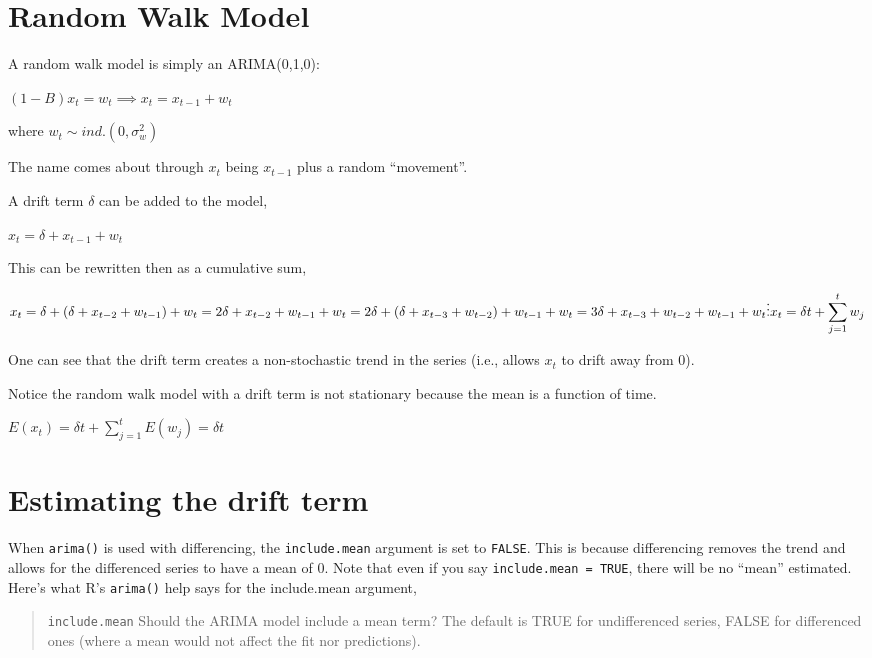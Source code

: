 \documentclass[
]{book}
\theoremstyle{definition}
\theoremstyle{definition}
\theoremstyle{definition}
\theoremstyle{definition}
\theoremstyle{remark}
\begin{document}
\hypertarget{random-walk-model}{%
\section{Random Walk Model}\label{random-walk-model}}

A random walk model is simply an ARIMA(0,1,0):

\((1-B)x_t=w_t\implies x_t=x_{t-1}+w_t\)

where \(w_t \sim ind.(0, \sigma_w^2)\)

The name comes about through \(x_t\) being \(x_{t-1}\) plus a random ``movement''.

A drift term \(\delta\) can be added to the model,

\(x_t=\delta+x_{t-1}+w_t\)

This can be rewritten then as a cumulative sum,

\[x_t=\delta+(\delta+x_{t-2}+w_{t-1})+w_t\\
=2\delta+x_{t-2}+w_{t-1}+w_t\\
=2\delta+(\delta+x_{t-3}+w_{t-2})+w_{t-1}+w_t\\
=3\delta+x_{t-3}+w_{t-2}+w_{t-1}+w_t\\
\vdots\\
x_t=\delta t+\sum_{j=1}^{t}w_j\]

One can see that the drift term creates a non-stochastic trend in the series (i.e., allows \(x_t\) to drift away from 0).

Notice the random walk model with a drift term is not stationary because the mean is a function of time.

\(E(x_t)=\delta t +\sum_{j=1}^{t}E(w_j)=\delta t\)

\hypertarget{estimating-the-drift-term}{%
\section{Estimating the drift term}\label{estimating-the-drift-term}}

When \texttt{arima()} is used with differencing, the \texttt{include.mean} argument is set to \texttt{FALSE}. This is because differencing removes the trend and allows for the differenced series to have a mean of 0. Note that even if you say \texttt{include.mean\ =\ TRUE}, there will be no ``mean'' estimated. Here's what R's \texttt{arima()} help says for the include.mean argument,

\begin{quote}
\texttt{include.mean} Should the ARIMA model include a mean term? The default is TRUE for undifferenced series, FALSE for differenced ones (where a mean would not affect the fit nor predictions).
\end{quote}
\end{document}
